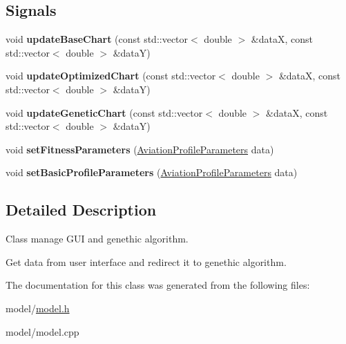 \subsection*{Signals}
\begin{DoxyCompactItemize}
\item 
\mbox{\label{class_model_aaafc71e874110691200a3669d7e2de09}} 
void {\bfseries update\+Base\+Chart} (const std\+::vector$<$ double $>$ \&dataX, const std\+::vector$<$ double $>$ \&dataY)
\item 
\mbox{\label{class_model_a75de03d87bf729d8204c303d1b465db6}} 
void {\bfseries update\+Optimized\+Chart} (const std\+::vector$<$ double $>$ \&dataX, const std\+::vector$<$ double $>$ \&dataY)
\item 
\mbox{\label{class_model_a054ed50fcc64d1d202e9e12acb1654b1}} 
void {\bfseries update\+Genetic\+Chart} (const std\+::vector$<$ double $>$ \&dataX, const std\+::vector$<$ double $>$ \&dataY)
\item 
\mbox{\label{class_model_afbde50de7b8ca6bdeeb169605fa144f4}} 
void {\bfseries set\+Fitness\+Parameters} (\hyperlink{struct_aviation_profile_parameters}{Aviation\+Profile\+Parameters} data)
\item 
\mbox{\label{class_model_a5dd37391b4c2efe80fa29ab7f84157aa}} 
void {\bfseries set\+Basic\+Profile\+Parameters} (\hyperlink{struct_aviation_profile_parameters}{Aviation\+Profile\+Parameters} data)
\end{DoxyCompactItemize}


\subsection{Detailed Description}
Class manage G\+UI and genethic algorithm. 

Get data from user interface and redirect it to genethic algorithm. 

The documentation for this class was generated from the following files\+:\begin{DoxyCompactItemize}
\item 
model/\hyperlink{model_8h}{model.\+h}\item 
model/model.\+cpp\end{DoxyCompactItemize}

